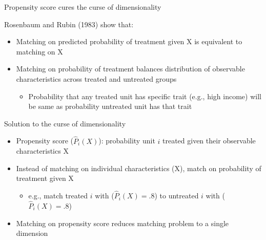 \begin{frame}[shrink=10]{Propensity score cures the curse of dimensionality}
	
	Rosenbaum and Rubin (1983) show that:
	\begin{itemize}
		\item Matching on predicted probability of treatment given X is equivalent to matching on X
		\item Matching on probability of treatment balances distribution of observable characteristics across treated and untreated groups
		\begin{itemize}
			\item Probability that any treated unit has specific trait (e.g., high income) will be same as probability untreated unit has that trait
		\end{itemize}
		
	\end{itemize}
	
	\vspace{3mm}
	Solution to the curse of dimensionality
	\begin{itemize}
		\item Propensity score ($\hat{P}_i(X)$): probability unit $i$ treated given their observable characteristics X
		\item Instead of matching on individual characteristics (X), match on probability of treatment given X
		\begin{itemize}
			\item e.g., match treated $i$ with ($\hat{P}_i(X)=.8$) to untreated $i$ with ($\hat{P}_i(X)=.8$)
		\end{itemize}
		\item Matching on propensity score reduces matching problem to a single dimension
	\end{itemize}

\end{frame}

